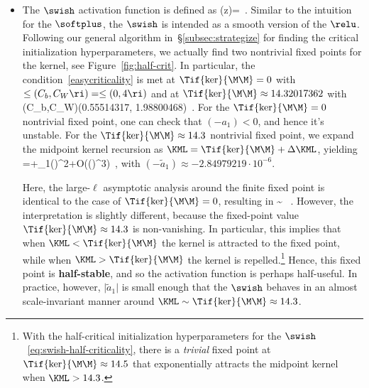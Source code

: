 \begin{itemize}
\item The $\swish$ activation function is defined as
\be
\sigma(z)=\, .
\ee
Similar to the intuition for the $\softplus$, the $\swish$ is intended as a smooth version of the $\relu$.
Following our general algorithm in~\S\ref{subsec:strategize} for finding the critical initialization hyperparameters, we actually find two nontrivial fixed points for the kernel, see Figure~\ref{fig:half-crit}.  In particular, the condition~\eqref{easycriticality} is met at $\Tif{\ker}{\M\M}=0$ with $\le(C_b,C_W\ri)=\le(0,4\ri)$ and at
$\Tif{\ker}{\M\M}\approx 14.32017362$ with
\be\label{eq:swish-half-criticality}
\le(C_b,C_W\ri)\approx\le(0.55514317, 1.98800468\ri)\, .
\ee 
 For the $\Tif{\ker}{\M\M}=0$ nontrivial fixed point, one can check that $(-a_1)<0$, and hence it's unstable. For the $\Tif{\ker}{\M\M}\approx 14.3$ nontrivial fixed point, we expand the midpoint kernel recursion as $\KML=\Tif{\ker}{\M\M}+\Delta \KML$, yielding
 \be
\Delta {}=\Delta \Ti{\ker}{\M\M}{\ell}+_1\le(\Delta \Ti{\ker}{\M\M}{\ell}\ri)^2+O\!\le(\le(\Delta \Ti{\ker}{\M\M}{\ell}\ri)^3\ri)\, ,
\ee
with 
$(-\tilde{a}_1)\approx-2.84979219\cdot 10^{-6}$.  

Here, the large-$\ell$ asymptotic analysis around the finite fixed point is identical to the case of $\Tif{\ker}{\M\M}=0$, resulting in
\be
\Delta \KML\sim{} \, .
\ee
However, the interpretation is slightly different, because the fixed-point value $\Tif{\ker}{\M\M}\approx 14.3$ is non-vanishing. In particular, this implies that when $\KML<\Tif{\ker}{\M\M}$ the kernel is attracted to the fixed point, while when $\KML>\Tif{\ker}{\M\M}$ the kernel is repelled.\footnote{With the half-critical initialization hyperparameters for the $\swish$~\eqref{eq:swish-half-criticality}, there is a \emph{trivial} fixed point at $\Tif{\ker}{\M\M}\approx 14.5$ that exponentially attracts the midpoint kernel when $\KML>14.3$.} Hence, this fixed point is \textbf{half-stable}, and so the activation function is perhaps half-useful. In practice, however,  $\vert \tilde{a}_1\vert $ is small enough that the $\swish$ behaves in an almost scale-invariant manner around $\KML\sim\Tif{\ker}{\M\M}\approx 14.3$.
 

\end{itemize}
